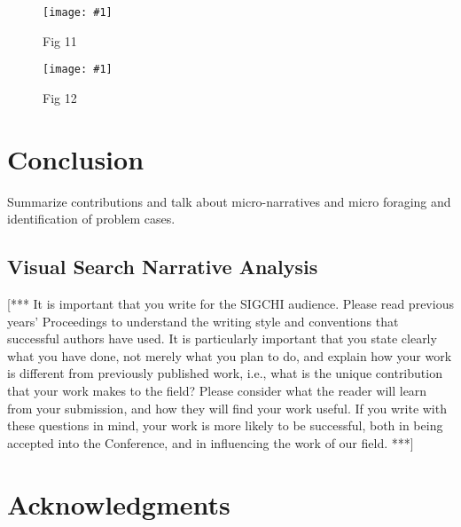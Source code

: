 \documentclass{sigchi}
\newcommand{\insertpicture}[2]{\begin{center}\texttt{[image: \#1]}\end{center}}
\begin{document}
\begin{figure}

	\insertpicture{figures/dummy.eps}{0.5}
	\caption{Fig 11 \label{fig11}}

\end{figure}


\begin{figure}

	\insertpicture{figures/dummy.eps}{0.5}
	\caption{Fig 12 \label{fig12}}

\end{figure}


					
\section{Conclusion} Summarize contributions and talk about
micro-narratives and micro foraging and identification of problem cases.

\subsection{Visual Search Narrative Analysis}


[***  It is important that you write for the SIGCHI audience.  Please read
previous years' Proceedings to understand the writing style and conventions
that successful authors have used.  It is particularly important that you
state clearly what you have done, not merely what you plan to do, and
explain how your work is different from previously published work, i.e.,
what is the unique contribution that your work makes to the field?  Please
consider what the reader will learn from your submission, and how they will
find your work useful.  If you write with these questions in mind, your
work is more likely to be successful, both in being accepted into the
Conference, and in influencing the work of our field. ***]

\section{Acknowledgments}

\balance


 

 
\end{document}
